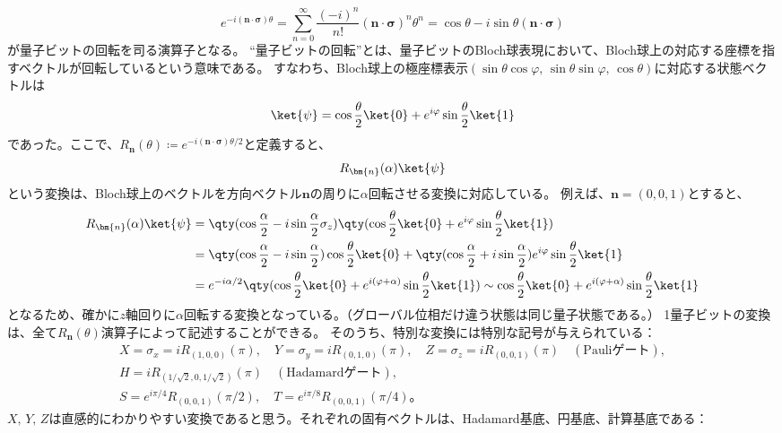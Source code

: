 \documentclass[a4paper,11pt,uplatex]{jsarticle}%
\begin{document}
\begin{equation}
  e^{-i(\bm{n}\cdot\bm{\sigma})\theta}=\sum_{n=0}^{\infty}\frac{(-i)^{n}}{n!}(\bm{n}\cdot\bm{\sigma})^n\theta^n = \cos\theta - i\sin\theta(\bm{n}\cdot\bm{\sigma})
\end{equation}
が量子ビットの回転を司る演算子となる。
``量子ビットの回転''とは、量子ビットのBloch球表現において、Bloch球上の対応する座標を指すベクトルが回転しているという意味である。
すなわち、Bloch球上の極座標表示$(\sin\theta\cos\varphi,\,\sin\theta\sin\varphi,\,\cos\theta)$に対応する状態ベクトルは
\begin{equation}
  \ket{\psi}=\cos\frac{\theta}{2}\ket{0}+e^{i\varphi}\sin\frac{\theta}{2}\ket{1}
\end{equation}
であった。ここで、$R_{\bm{n}}(\theta)\coloneqq e^{-i(\bm{n}\cdot\bm{\sigma})\theta/2}$と定義すると、
\begin{equation}
  R_{\bm{n}}(\alpha)\ket{\psi}
\end{equation}
という変換は、Bloch球上のベクトルを方向ベクトル$\bm{n}$の周りに$\alpha$回転させる変換に対応している。
例えば、$\bm{n}=(0,0,1)$とすると、
\begin{align}
  R_{\bm{n}}(\alpha)\ket{\psi}&=
  \qty(\cos{\frac{\alpha}{2}}-i\sin\frac{\alpha}{2}\sigma_z)\qty(\cos\frac{\theta}{2}\ket{0}+e^{i\varphi}\sin\frac{\theta}{2}\ket{1}) \\
  &= \qty(\cos\frac{\alpha}{2}-i\sin\frac{\alpha}{2})\cos\frac{\theta}{2}\ket{0}+\qty(\cos\frac{\alpha}{2}+i\sin\frac{\alpha}{2})e^{i\varphi}\sin\frac{\theta}{2}\ket{1} \\
  &= e^{-i\alpha/2}\qty(\cos\frac{\theta}{2}\ket{0}+e^{i(\varphi+\alpha)}\sin\frac{\theta}{2}\ket{1}) \sim \cos\frac{\theta}{2}\ket{0}+e^{i(\varphi+\alpha)}\sin\frac{\theta}{2}\ket{1}
\end{align}
となるため、確かに$z$軸回りに$\alpha$回転する変換となっている。（グローバル位相だけ違う状態は同じ量子状態である。）
1量子ビットの変換は、全て$R_{\bm{n}}(\theta)$演算子によって記述することができる。
そのうち、特別な変換には特別な記号が与えられている：
\begin{gather}
  X = \sigma_x= iR_{(1,0,0)}(\pi),\quad Y = \sigma_y = iR_{(0,1,0)}(\pi),\quad Z = \sigma_z =iR_{(0,0,1)}(\pi)\quad(\text{Pauliゲート}), \\
  H=iR_{(1/\sqrt{2},0,1/\sqrt{2})}(\pi)\quad(\text{Hadamardゲート}), \\
  S= e^{i\pi/4}R_{(0,0,1)}(\pi/2),\quad T=e^{i\pi/8}R_{(0,0,1)}(\pi/4)。
\end{gather}
$X,\,Y,\,Z$は直感的にわかりやすい変換であると思う。それぞれの固有ベクトルは、Hadamard基底、円基底、計算基底である：
\end{document}
